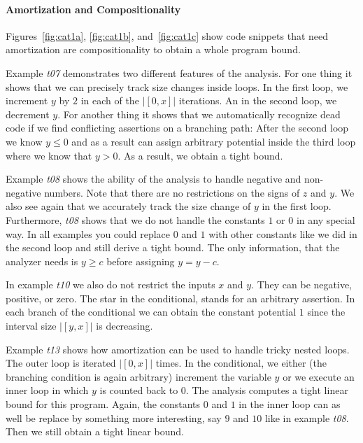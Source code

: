 \documentclass[nocopyrightspace,preprint]{sigplanconf}
\begin{document}
\paragraph{Amortization and Compositionality}

Figures~\ref{fig:cat1a}, \ref{fig:cat1b}, and~\ref{fig:cat1c} show
code snippets that need amortization are compositionality to obtain a
whole program bound.

Example \emph{t07} demonstrates two different features of the
analysis.  For one thing it shows that we can precisely track size
changes inside loops.  In the first loop, we increment $y$ by $2$ in
each of the $|[0,x]|$ iterations.  An in the second loop, we decrement
$y$.  For another thing it shows that we automatically recognize dead
code if we find conflicting assertions on a branching path: After the
second loop we know $y \leq 0$ and as a result can assign arbitrary
potential inside the third loop where we know that $y>0$.  As a
result, we obtain a tight bound.

Example \emph{t08} shows the ability of the analysis to handle
negative and non-negative numbers.  Note that there are no
restrictions on the signs of $z$ and $y$.  We also see again that we
accurately track the size change of $y$ in the first loop.
Furthermore, \emph{t08} shows that we do not handle the constants $1$
or $0$ in any special way.  In all examples you could replace $0$ and
$1$ with other constants like we did in the second loop and still
derive a tight bound.  The only information, that the analyzer needs
is $y \geq c$ before assigning $y = y - c$.

In example \emph{t10} we also do not restrict the inputs $x$ and $y$.
They can be negative, positive, or zero.  The star {\tt *} in the
conditional, stands for an arbitrary assertion.  In each branch of the
conditional we can obtain the constant potential $1$ since the interval
size $|[y,x]|$ is decreasing.

Example \emph{t13} shows how amortization can be used to handle tricky
nested loops.  The outer loop is iterated $|[0,x]|$ times.  In the
conditional, we either (the branching condition is again arbitrary)
increment the variable $y$ or we execute an inner loop in which $y$ is
counted back to $0$.  The analysis computes a tight linear bound for
this program.  Again, the constants $0$ and $1$ in the inner loop can
as well be replace by something more interesting, say $9$ and $10$
like in example \emph{t08}.  Then we still obtain a tight linear
bound.
\end{document}
